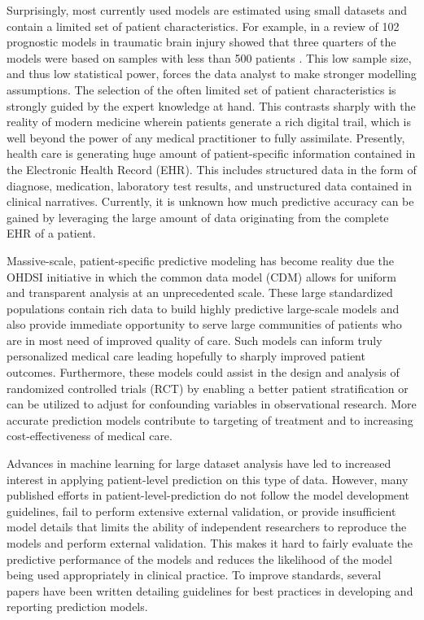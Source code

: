 \documentclass[11pt]{book}
\begin{document}
Surprisingly, most currently used models are estimated using small
datasets and contain a limited set of patient characteristics. For
example, in a review of 102 prognostic models in traumatic brain injury
showed that three quarters of the models were based on samples with less
than 500 patients \citep{perel2006}. This low sample size, and thus low
statistical power, forces the data analyst to make stronger modelling
assumptions. The selection of the often limited set of patient
characteristics is strongly guided by the expert knowledge at hand. This
contrasts sharply with the reality of modern medicine wherein patients
generate a rich digital trail, which is well beyond the power of any
medical practitioner to fully assimilate. Presently, health care is
generating huge amount of patient-specific information contained in the
Electronic Health Record (EHR). This includes structured data in the
form of diagnose, medication, laboratory test results, and unstructured
data contained in clinical narratives. Currently, it is unknown how much
predictive accuracy can be gained by leveraging the large amount of data
originating from the complete EHR of a patient.

Massive-scale, patient-specific predictive modeling has become reality
due the OHDSI initiative in which the common data model (CDM) allows for
uniform and transparent analysis at an unprecedented scale. These large
standardized populations contain rich data to build highly predictive
large-scale models and also provide immediate opportunity to serve large
communities of patients who are in most need of improved quality of
care. Such models can inform truly personalized medical care leading
hopefully to sharply improved patient outcomes. Furthermore, these
models could assist in the design and analysis of randomized controlled
trials (RCT) by enabling a better patient stratification or can be
utilized to adjust for confounding variables in observational research.
More accurate prediction models contribute to targeting of treatment and
to increasing cost-effectiveness of medical care.

Advances in machine learning for large dataset analysis have led to
increased interest in applying patient-level prediction on this type of
data. However, many published efforts in patient-level-prediction do not
follow the model development guidelines, fail to perform extensive
external validation, or provide insufficient model details that limits
the ability of independent researchers to reproduce the models and
perform external validation. This makes it hard to fairly evaluate the
predictive performance of the models and reduces the likelihood of the
model being used appropriately in clinical practice. To improve
standards, several papers have been written detailing guidelines for
best practices in developing and reporting prediction models.
\end{document}
